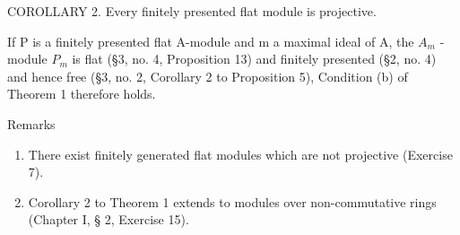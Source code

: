 COROLLARY 2. Every finitely presented flat module is projective.\par

If P is a finitely presented flat A-module and m a maximal ideal of A, the \(A_{m}\) -module \(P_{m}\) is flat (§3, no. 4, Proposition 13) and finitely presented (§2, no. 4) and hence free (§3, no. 2, Corollary 2 to Proposition 5), Condition (b) of Theorem 1 therefore holds.

Remarks

\begin{enumerate}
\def\labelenumi{(\arabic{enumi})}
\item
  There exist finitely generated flat modules which are not projective (Exercise 7).
\item
  Corollary 2 to Theorem 1 extends to modules over non-commutative rings (Chapter I, § 2, Exercise 15).
\end{enumerate}
\relax{}
